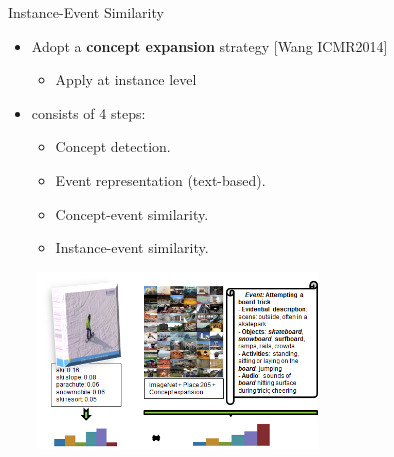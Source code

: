 \documentclass{beamer}
\begin{document}
\begin{frame}{Instance-Event Similarity} 	
	\begin{itemize}	
		\item Adopt a \textbf{concept expansion} strategy [Wang ICMR2014]
				\begin{itemize}	
					\item Apply at instance level
				\end{itemize}	
	\item consists of 4 steps:
	
		\begin{itemize}
			\item Concept detection.
			\item Event representation (text-based).
			\item Concept-event similarity.
			\item Instance-event similarity.
		\end{itemize}
		
	\end{itemize}		
	\begin{center}
		\includegraphics[width=9cm,height=4.7cm]{images/part4/similarity.png}
	\end{center}

\end{frame}	
\end{document}
